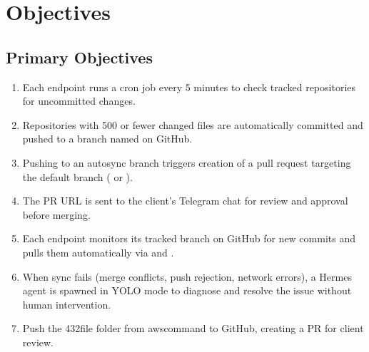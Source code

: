 \documentclass[letterpaper,10pt,openany,oneside,english]{sphinxmanual}
\begin{document}
\section{Objectives}
\label{\detokenize{objectives:objectives}}\label{\detokenize{objectives::doc}}

\subsection{Primary Objectives}
\label{\detokenize{objectives:primary-objectives}}\begin{enumerate}
%
\item {} 
\sphinxAtStartPar
{} \textendash{} Each endpoint runs a cron job every 5 minutes to check tracked repositories for uncommitted changes.

\item {} 
\sphinxAtStartPar
{} \textendash{} Repositories with 500 or fewer changed files are automatically committed and pushed to a branch named  on GitHub.

\item {} 
\sphinxAtStartPar
{} \textendash{} Pushing to an autosync branch triggers creation of a pull request targeting the default branch ( or ).

\item {} 
\sphinxAtStartPar
{} \textendash{} The PR URL is sent to the client’s Telegram chat for review and approval before merging.

\item {} 
\sphinxAtStartPar
{} \textendash{} Each endpoint monitors its tracked branch on GitHub for new commits and pulls them automatically via  and .

\item {} 
\sphinxAtStartPar
{} \textendash{} When sync fails (merge conflicts, push rejection, network errors), a Hermes agent is spawned in YOLO mode to diagnose and resolve the issue without human intervention.

\item {} 
\sphinxAtStartPar
{} \textendash{} Push the 432\sphinxhyphen{}file  folder from aws\sphinxhyphen{}command to GitHub, creating a PR for client review.

\end{enumerate}
\end{document}
